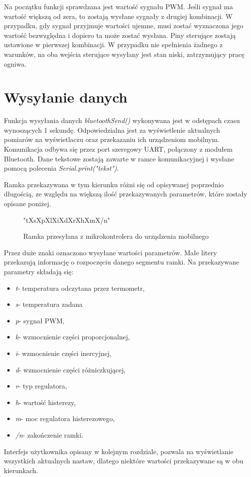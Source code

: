 Na początku funkcji sprawdzana jest wartość sygnału PWM. Jeśli sygnał ma wartość większą od zera, to zostają wysłane sygnały z drugiej kombinacji. W przypadku, gdy sygnał przyjmuje wartości ujemne, musi zostać wyznaczona jego wartość bezwzględna i dopiero ta może zostać wysłana. Piny sterujące zostają ustawione w pierwszej kombinacji. W przypadku nie spełnienia żadnego z warunków, na oba wejścia sterujące wysyłany jest stan niski, zatrzymujący pracę ogniwa.

\section{Wysyłanie danych} %
Funkcja wysyłania danych \textit{bluetoothSend()} wykonywana jest w odstępach czasu wynoszących 1 sekundę. Odpowiedzialna jest za wyświetlenie aktualnych pomiarów na wyświetlaczu oraz przekazaniu ich urządzeniom mobilnym. Komunikacja odbywa się przez port szeregowy UART, połączony z modułem Bluetooth. Dane tekstowe zostają zawarte w ramce komunikacyjnej i wysłane pomocą polecenia \textit{Serial.print("tekst")}.

Ramka przekazywana w tym kierunku różni się od opisywanej poprzednio długością, ze względu na większą ilość przekazywanych parametrów, które zostały opisane poniżej.
\begin{figure}[H]
\label{ramkaOdArduino}
\centering
\Huge "tXsXpXlXiXdXrXhXmX/n"
\caption{Ramka przesyłana z mikrokontrolera do urządzenia mobilnego}
\end{figure}
Przez duże znaki oznaczono wysyłane wartości parametrów. Małe litery przekazują informację o rozpoczęciu danego segmentu ramki. Na przekazywane parametry składają się:
\begin{itemize}
\item \textit{t}- temperatura odczytana przez termometr,
\item \textit{s}- temperatura zadana
\item \textit{p}- sygnał PWM,
\item \textit{k}- wzmocnienie części proporcjonalnej,
\item \textit{i}- wzmocnienie części inercyjnej,
\item \textit{d}- wzmocnienie części różniczkującej,
\item \textit{r}- typ regulatora,
\item \textit{h}- wartość histerezy,
\item \textit{m}- moc regulatora histerezowego,
\item \textit{/n}- zakończenie ramki.
\end{itemize}
Interfejs użytkownika opisany w kolejnym rozdziale, pozwala na wyświetlanie wszystkich aktualnych nastaw, dlatego niektóre wartości przekazywane są w obu kierunkach.


